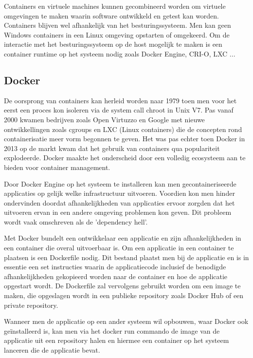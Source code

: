 Containers en virtuele machines kunnen gecombineerd worden om virtuele omgevingen te maken waarin software ontwikkeld en getest kan worden. Containers blijven wel afhankelijk van het besturingssysteem. Men kan geen Windows containers in een Linux omgeving opstarten of omgekeerd. Om de interactie met het besturingssysteem op de host mogelijk te maken is een container runtime op het systeem nodig zoals Docker Engine, CRI-O, LXC ...

\subsection{Docker}

De oorsprong van containers kan herleid worden naar 1979 toen men voor het eerst een proces kon isoleren via de system call chroot in Unix V7. Pas vanaf 2000 kwamen bedrijven zoals Open Virtuzzo en Google met nieuwe ontwikkellingen zoals cgroups en LXC (Linux containers) die de concepten rond containerisatie meer vorm begonnen te geven. Het was pas echter toen Docker in 2013 op de markt kwam dat het gebruik van containers qua populariteit explodeerde. 
Docker maakte het onderscheid door een volledig ecosysteem aan te bieden voor container management.\autocite{Osnat2020} 

Door Docker Engine op het systeem te installeren kan men gecontaineriseerde applicaties op gelijk welke infrastructuur uitvoeren. Voordien kon men hinder ondervinden doordat afhankelijkheden van applicaties ervoor zorgden dat het uitvoeren ervan in een andere omgeving problemen kon geven. Dit probleem wordt vaak omschreven als de 'dependency hell'.

Met Docker bundelt een ontwikkelaar een applicatie en zijn afhankelijkheden in een container die overal uitvoerbaar is. Om een applicatie in een container te plaatsen is een Dockerfile nodig. 
Dit bestand plaatst men bij de applicatie en is in essentie een set instructies waarin de applicatiecode inclusief de benodigde afhankelijkheden gekopieerd worden naar de container en hoe de applicatie opgestart wordt. De Dockerfile zal vervolgens gebruikt worden om een image te maken, die opgeslagen wordt in een publieke repository zoals Docker Hub of een private repository.

Wanneer men de applicatie op een ander systeem wil opbouwen, waar Docker ook geïnstalleerd is, kan men via het docker run commando de image van de applicatie uit een repository halen en hiermee een container op het systeem lanceren die de applicatie bevat.  

